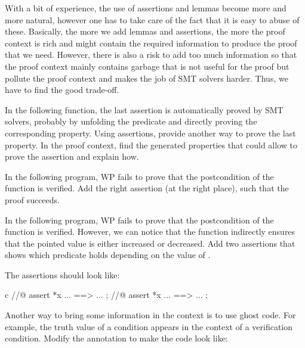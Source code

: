 With a bit of experience, the use of assertions and lemmas become more and more
natural, however one has to take care of the fact that it is easy to abuse of
these. Basically, the more we add lemmas and assertions, the more the proof
context is rich and might contain the required information to produce the proof
that we need. However, there is also a risk to add too much information so that
the proof context mainly contains garbage that is not useful for the proof but
pollute the proof context and makes the job of SMT solvers harder. Thus, we have
to find the good trade-off.






In the following function, the last assertion is automatically proved by SMT
solvers, probably by unfolding the predicate and directly proving the
corresponding property. Using assertions, provide another way to prove the
last property. In the proof context, find the generated properties that could
allow to prove the assertion and explain how.






In the following program, WP fails to prove that the postcondition of the
function  is verified. Add the right assertion (at the right
place), such that the proof succeeds.






In the following program, WP fails to prove that the postcondition of the
function  is verified. However, we can notice that the
 function indirectly ensures that the pointed value is either
increased or decreased. Add two assertions that shows which predicate holds
depending on the value of .




The assertions should look like:


\begin{CodeBlock}{c}
//@ assert *x ... ==> ... ;
//@ assert *x ... ==> ... ;
\end{CodeBlock}


Another way to bring some information in the context is to use ghost code.
For example, the truth value of a condition appears in the context of a
verification condition. Modify the annotation to make the code look like:


